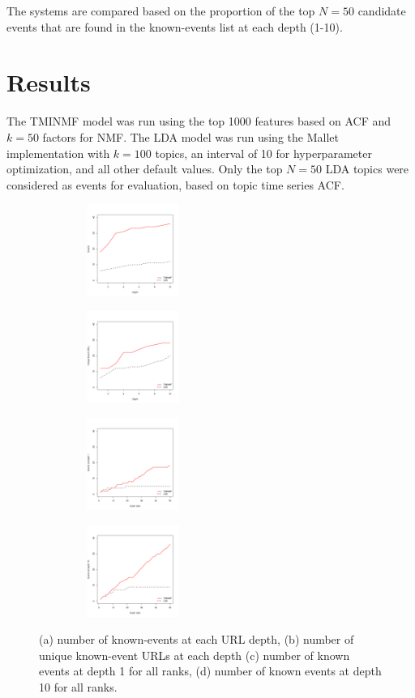 \documentclass{sig-alternate}
\begin{document}
The systems are compared based on the proportion of the top $N=50$ candidate events that are found in the known-events list at each depth (1-10).

\section{Results}
The TMINMF model was run using the top 1000 features based on ACF and $k=50$ factors for NMF. The LDA model was run using the Mallet implementation with $k=100$ topics, an interval of 10 for hyperparameter optimization, and all other default values. Only the top $N=50$ LDA topics were considered as events for evaluation, based on topic time series ACF.


\begin{figure}[!ht]
\centering
\begin{subfigure}{.25\textwidth}
  \centering
\includegraphics[width=4cm, height=3cm]{plots/events_at_depth.pdf}
\end{subfigure}%
\begin{subfigure}{.25\textwidth}
  \centering
\includegraphics[width=4cm, height=3cm]{plots/unique_urls_at_depth.pdf}
\end{subfigure}
\begin{subfigure}{.25\textwidth}
  \centering
\includegraphics[width=4cm, height=3cm]{plots/events_at_rank_1.pdf}
\end{subfigure}%
\begin{subfigure}{.25\textwidth}
  \centering
\includegraphics[width=4cm, height=3cm]{plots/events_at_rank_10.pdf}
\end{subfigure}
\caption{(a) number of known-events at each URL depth, (b) number of unique known-event URLs at each depth (c) number of known events at depth 1 for all ranks, (d) number of known events at depth 10 for all ranks.}
\label{fig.eventdist}
\end{figure}
\end{document}
